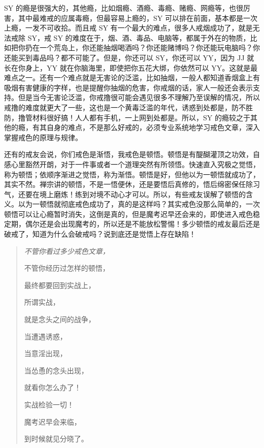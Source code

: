 SY 的瘾是很强大的，其他瘾，比如烟瘾、酒瘾、毒瘾、赌瘾、网瘾等，也很厉害，其中最难戒的应属毒瘾，但最容易上瘾的，SY 可以排在前面，基本都是一次上瘾，一发不可收拾。而且戒 SY 有一个最大的难点，很多人戒烟成功了，就是无法戒除 SY，戒 SY 的难度在于，烟、酒、毒品、电脑等，都属于外在的物质，比如把你扔在一个荒岛上，你还能抽烟喝酒吗？你还能赌博吗？你还能玩电脑吗？你还能买到毒品吗？都不可能了。但是，你还可以 SY，你还可以 YY，因为 JJ 就长在你身上，YY 就在你脑海里，即使把你五花大绑，你依然可以 YY。这就是最难点之一。还有一个难点就是无害论的泛滥，比如抽烟，一般人都知道香烟盒上有吸烟有害健康的字样，也是提醒你抽烟的危害，你戒烟的话，家人一般还会表示支持。但是当今无害论泛滥，你戒撸很可能会遇见很多不理解乃至误解的情况，所以戒撸的难度就更大了一些，这也是一个黄毒泛滥的年代，诱惑到处都是，防不胜防，撸管材料很好搞！人人都有手机，一上网到处都是。所以，SY 的瘾较之于其他的瘾，有其自身的难点，不是那么好戒的，必须专业系统地学习戒色文章，深入掌握戒色的原理与规律。

还有的戒友会说，你们戒色是渐悟，我戒色是顿悟。顿悟是有醍醐灌顶之功效，自感心里豁然开朗，对于一件事或者一个道理突然有所领悟。快速直入究极之觉悟，称为顿悟；依顺序渐进之觉悟，称为渐悟。顿悟是好，但他以为一顿悟就成功了，其实不然。禅宗讲的顿悟，不是一悟便休，还是要悟后真修的，悟后绵密保任除习气，还要在境上磨炼！练到对境不动心才可以。所以，有些戒友误解了顿悟的含义。以为一顿悟就彻底戒色成功了，真的是这样吗？其实戒色没那么简单的，一次顿悟可以让心瘾暂时消失，这倒是真的，但是魔考迟早还会来的，即使进入戒色稳定期，偶尔还是会出现魔考的，所以还是不能放松警惕！多少顿悟的戒友最后还是破戒了，知道为什么会破戒吗？说到底还是觉悟上存在缺陷！

\begin{multicols}{2}
    \begin{quotation}\it
        不管你看过多少戒色文章，

        不管你经历过怎样的顿悟，

        最终都要回到实战上，

        所谓实战，

        就是念头之间的战争，

        当遭遇诱惑，

        当意淫出现，

        当怂恿的念头出现，

        就看你怎么办了！

        实战检验一切！

        魔考迟早会来临，

        到时候就见分晓了。
    \end{quotation}
\end{multicols}

